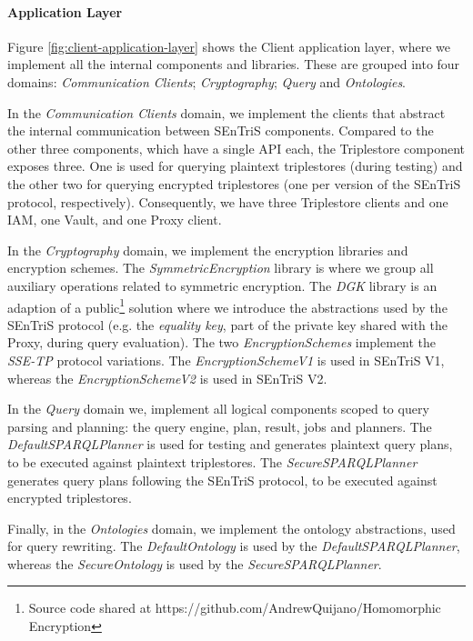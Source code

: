 \paragraph*{Application Layer} Figure \ref{fig:client-application-layer} shows the Client application layer, where we implement all the internal components and libraries. These are grouped into four domains: \emph{Communication Clients}; \emph{Cryptography}; \emph{Query} and \emph{Ontologies}.

In the \emph{Communication Clients} domain, we implement the clients that abstract the internal communication between \gls{SEnTriS} components. Compared to the other three components, which have a single \gls{API} each, the Triplestore component exposes three. One is used for querying plaintext triplestores (during testing) and the other two for querying encrypted triplestores (one per version of the \gls{SEnTriS} protocol, respectively). Consequently, we have three Triplestore clients and one \gls{IAM}, one Vault, and one Proxy client.

In the \emph{Cryptography} domain, we implement the encryption libraries and encryption schemes. The \emph{SymmetricEncryption} library is where we group all auxiliary operations related to symmetric encryption. The \emph{DGK} library is an adaption of a public\footnote{Source code shared at https://github.com/AndrewQuijano/Homomorphic Encryption} solution \autocite{Quijano2019-au} where we introduce the abstractions used by the \gls{SEnTriS} protocol (e.g. the \emph{equality key}, part of the private key shared with the Proxy, during query evaluation). The two \emph{EncryptionSchemes} implement the \emph{SSE-TP} protocol variations. The \emph{EncryptionSchemeV1} is used in \gls{SEnTriS} V1, whereas the \emph{EncryptionSchemeV2} is used in \gls{SEnTriS} V2.

In the \emph{Query} domain we, implement all logical components scoped to query parsing and planning: the query engine, plan, result, jobs and planners. The \emph{DefaultSPARQLPlanner} is used for testing and generates plaintext query plans, to be executed against plaintext triplestores. The \emph{SecureSPARQLPlanner} generates query plans following the \gls{SEnTriS} protocol, to be executed against encrypted triplestores.

Finally, in the \emph{Ontologies} domain, we implement the ontology abstractions, used for query rewriting. The \emph{DefaultOntology} is used by the \emph{DefaultSPARQLPlanner}, whereas the \emph{SecureOntology} is used by the \emph{SecureSPARQLPlanner}.

